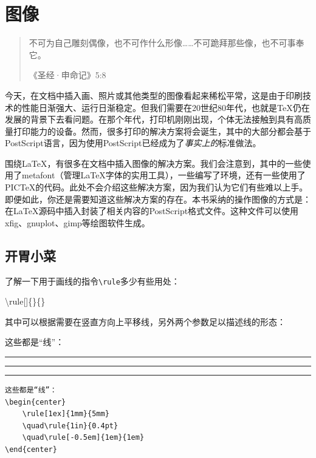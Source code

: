 \chapter{图像}

\begin{quote}
    不可为自己雕刻偶像，也不可作什么形像……不可跪拜那些像，也不可事奉它。
    
    \hfill《圣经·申命记》5:8
\end{quote}

今天，在文档中插入画、照片或其他类型的图像看起来稀松平常，这是由于印刷技术的性能日渐强大、运行日渐稳定。但我们需要在20世纪80年代，也就是\TeX 仍在发展的背景下去看问题。在那个年代，打印机刚刚出现，个体无法接触到具有高质量打印能力的设备。然而，很多打印的解决方案将会诞生，其中的大部分都会基于PostScript语言，因为使用PostScript已经成为了\emph{事实上的}标准做法。

围绕\LaTeX ，有很多在文档中插入图像的解决方案。我们会注意到，其中的一些使用了\textsf{metafont}（管理\LaTeX 字体的实用工具），一些编写了环境，还有一些使用了PIC\TeX 的代码。此处不会介绍这些解决方案，因为我们认为它们有些难以上手。即便如此，你还是需要知道这些解决方案的存在。本书采纳的操作图像的方式是：在\LaTeX 源码中插入封装了相关内容的PostScript格式文件。这种文件可以使用\textsf{xfig}、\textsf{gnuplot}、\textsf{gimp}等绘图软件生成。

\section{开胃小菜}

了解一下用于画线的指令\verb|\rule|多少有些用处：

\begin{dmd}
\backslash rule[]\{\}\{\}
\end{dmd}

其中可以根据需要在竖直方向上平移线，另外两个参数足以描述线的形态：

\begin{codelist}[5.1]{
    这些都是“线”：
\begin{center}
    \rule[1ex]{1mm}{5mm}
    \quad\rule{1in}{0.4pt}
    \quad\rule[-0.5em]{1em}{1em}
\end{center}
}\begin{verbatim}
这些都是“线”：
\begin{center}
    \rule[1ex]{1mm}{5mm}
    \quad\rule{1in}{0.4pt}
    \quad\rule[-0.5em]{1em}{1em}
\end{center}
\end{verbatim}
\end{codelist}

